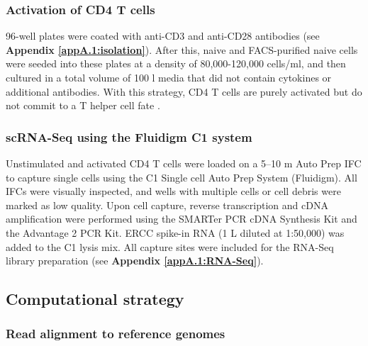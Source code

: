 \newpage

\subsubsection{Activation of CD4\plus{} T cells}

96-well plates were coated with anti-CD3\textepsilon{} and anti-CD28 antibodies (see \textbf{Appendix \ref{appA.1:isolation}}). 
After this, naive and FACS-purified naive cells were seeded into these plates at a density of 80,000-120,000 cells/ml, and then cultured in a total volume of 100 \textmu{}l media that did not contain cytokines or additional antibodies. 
With this strategy, CD4\plus{} T cells are purely activated but do not commit to a T helper cell fate \citep{Stubbington2015, Zhu2010}.

\subsubsection{scRNA-Seq using the Fluidigm C1 system}

Unstimulated and activated CD4\plus{} T cells were loaded on a 5–10 \textmu{}m Auto Prep IFC to capture single cells using the C1 Single cell Auto Prep System (Fluidigm). 
All IFCs were visually inspected, and wells with multiple cells or cell debris were marked as low quality. 
Upon cell capture, reverse transcription and cDNA amplification were performed using the SMARTer PCR cDNA Synthesis Kit and the Advantage 2 PCR Kit. 
ERCC spike-in RNA (1 \textmu{}L diluted at 1:50,000) was added to the C1 lysis mix. 
All capture sites were included for the RNA-Seq library preparation (see \textbf{Appendix \ref{appA.1:RNA-Seq}}).

\subsection{Computational strategy}
\label{sec1:computational}

\subsubsection{Read alignment to reference genomes}

